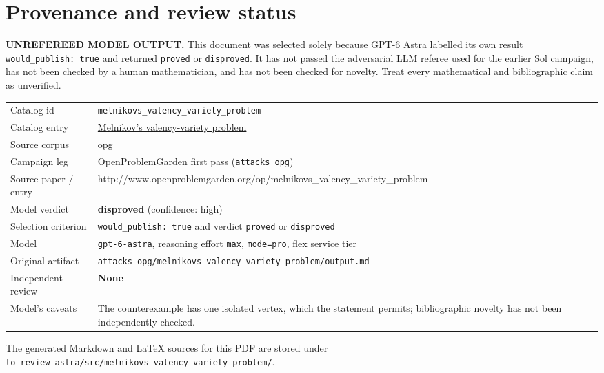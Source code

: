 \documentclass[
  11pt,
  a4paper,
]{article}
\newcounter{none} %
\begin{document}
\appendix

\section{Provenance and review
status}\label{provenance-and-review-status}

\begin{warning}

\textbf{UNREFEREED MODEL OUTPUT.} This document was selected solely
because GPT-6 Astra labelled its own result
\texttt{would\_publish:\ true} and returned \texttt{proved} or
\texttt{disproved}. It has not passed the adversarial LLM referee used
for the earlier Sol campaign, has not been checked by a human
mathematician, and has not been checked for novelty. Treat every
mathematical and bibliographic claim as unverified.

\end{warning}

{\def\LTcaptype{none} %
\begin{longtable}[]{@{}
  >{\raggedright\arraybackslash}p{}
  >{\raggedright\arraybackslash}p{}@{}}
\toprule\noalign{}
\endhead
\bottomrule\noalign{}
\endlastfoot
Catalog id & \texttt{melnikovs\_valency\_variety\_problem} \\
Catalog entry &
\href{https://graph-theory-ai.github.io/graph-conjectures/op/melnikovs_valency_variety_problem/}{Melnikov's
valency-variety problem} \\
Source corpus & opg \\
Campaign leg & OpenProblemGarden first pass (\texttt{attacks\_opg}) \\
Source paper / entry &
http://www.openproblemgarden.org/op/melnikovs\_valency\_variety\_problem \\
Model verdict & \textbf{disproved} (confidence: high) \\
Selection criterion & \texttt{would\_publish:\ true} and verdict
\texttt{proved} or \texttt{disproved} \\
Model & \texttt{gpt-6-astra}, reasoning effort \texttt{max},
\texttt{mode=pro}, flex service tier \\
Original artifact &
\texttt{attacks\_opg/melnikovs\_valency\_variety\_problem/output.md} \\
Independent review & \textbf{None} \\
Model's caveats & The counterexample has one isolated vertex, which the
statement permits; bibliographic novelty has not been independently
checked. \\
\end{longtable}
}

The generated Markdown and LaTeX sources for this PDF are stored under
\texttt{to\_review\_astra/src/melnikovs\_valency\_variety\_problem/}.
\end{document}
